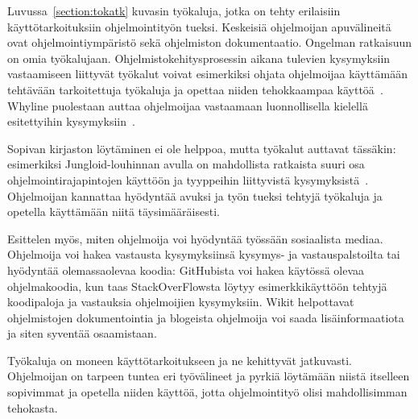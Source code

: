 \documentclass[finnish]{tktltiki2}
\theoremstyle{definition}
\theoremstyle{remark}
\begin{document}
Luvussa~\ref{section:tokatk} kuvasin työkaluja, jotka on tehty erilaisiin käyttötarkoituksiin ohjelmointityön tueksi. Keskeisiä ohjelmoijan apuvälineitä ovat ohjelmointiympäristö sekä ohjelmiston dokumentaatio.
Ongelman ratkaisuun on omia työkalujaan. Ohjelmistokehitysprosessin aikana tulevien kysymyksiin vastaamiseen liittyvät työkalut voivat esimerkiksi ohjata ohjelmoijaa käyttämään tehtävään tarkoitettuja työkaluja ja opettaa niiden tehokkaampaa käyttöä~\cite{programmers-coach}. Whyline puolestaan auttaa ohjelmoijaa vastaamaan luonnollisella kielellä esitettyihin kysymyksiin~\cite{whyline}.

Sopivan kirjaston löytäminen ei ole helppoa, mutta työkalut auttavat tässäkin:
esimerkiksi Jungloid-louhinnan avulla on mahdollista ratkaista suuri osa ohjelmointirajapintojen käyttöön ja tyyppeihin liittyvistä kysymyksistä~\cite{jungloid-mining}.
Ohjelmoijan kannattaa hyödyntää avuksi ja työn tueksi tehtyjä työkaluja ja opetella käyttämään niitä täysimääräisesti.

Esittelen myös, miten ohjelmoija voi hyödyntää työssään sosiaalista mediaa. Ohjelmoija voi hakea vastausta kysymyksiinsä kysymys- ja vastauspalstoilta tai hyödyntää olemassaolevaa koodia: GitHubista voi hakea käytössä olevaa ohjelmakoodia, kun taas StackOverFlowsta löytyy esimerkkikäyttöön tehtyjä koodipaloja ja vastauksia ohjelmoijien kysymyksiin.
Wikit helpottavat ohjelmistojen dokumentointia ja blogeista ohjelmoija voi saada lisäinformaatiota ja siten syventää osaamistaan.

Työkaluja on moneen käyttötarkoitukseen ja ne kehittyvät jatkuvasti. Ohjelmoijan on tarpeen tuntea eri työvälineet ja pyrkiä löytämään niistä itselleen sopivimmat ja opetella niiden käyttöä, jotta ohjelmointityö olisi mahdollisimman tehokasta.

\newpage


\end{document}
